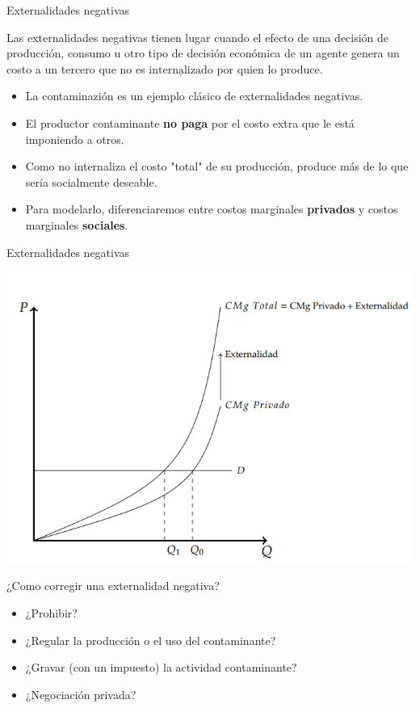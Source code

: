 \documentclass{beamer}
\begin{document}
\begin{frame}{Externalidades negativas}
    \begin{boxA}
        \centering
        Las externalidades negativas tienen lugar cuando el efecto de
        una decisión de producción, consumo u otro tipo de decisión
        económica de un agente genera un costo a un tercero que no es
        $\underline{\text{internalizado}}$ por quien lo produce.
    \end{boxA}
    \begin{itemize}
        \item La contaminazión es un ejemplo clásico de externalidades negativas.
        \item El productor contaminante \textbf{no paga} por el costo extra que le está imponiendo a otros.
        \item Como no internaliza el costo "total" de su producción, produce más de lo que sería socialmente deseable.
        \item Para modelarlo, diferenciaremos entre costos marginales \textbf{privados} y costos marginales \textbf{sociales}.
    \end{itemize}
\end{frame}

\begin{frame}{Externalidades negativas}
    \begin{center}
        \includegraphics[scale=0.7]{../Figures/C25.2.png}
    \end{center}
\end{frame}

\begin{frame}{¿Como corregir una externalidad negativa?}
    \begin{itemize}
        \item ¿Prohibir?
        \item ¿Regular la producción o el uso del contaminante?
        \item ¿Gravar (con un impuesto) la actividad contaminante?
        \item ¿Negociación privada?
    \end{itemize}
\end{frame}
\end{document}
